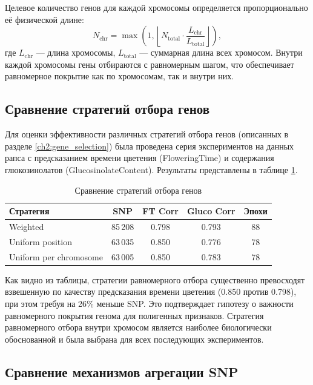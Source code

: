 Целевое количество генов для каждой хромосомы определяется 
пропорционально её физической длине:
\[
N_{\text{chr}} = \max\left(1, \left\lfloor N_{\text{total}} \cdot 
\frac{L_{\text{chr}}}{L_{\text{total}}} \right\rfloor\right),
\]
где $L_{\text{chr}}$ — длина хромосомы, $L_{\text{total}}$ — суммарная 
длина всех хромосом. Внутри каждой хромосомы гены отбираются с 
равномерным шагом, что обеспечивает равномерное покрытие как по 
хромосомам, так и внутри них.

\subsection{Сравнение стратегий отбора генов}

Для оценки эффективности различных стратегий отбора генов (описанных 
в разделе \ref{ch2:gene_selection}) была проведена серия экспериментов 
на данных рапса с предсказанием времени цветения (FloweringTime) и 
содержания глюкозинолатов (GlucosinolateContent). Результаты представлены 
в таблице \ref{tab:selection_comparison}.

\begin{table}
	\centering
	\caption{Сравнение стратегий отбора генов}
	\label{tab:selection_comparison}
	\begin{tabular}{|l|c|c|c|c|}
		\hline
		\textbf{Стратегия} & \textbf{SNP} & \textbf{FT Corr} & \textbf{Gluco Corr} & \textbf{Эпохи} \\ \hline
		Weighted & 85\,208 & 0.798 & 0.793 & 88 \\ \hline
		Uniform position & 63\,035 & 0.850 & 0.776 & 78 \\ \hline
		Uniform per chromosome & 63\,005 & 0.850 & 0.783 & 78 \\ \hline
	\end{tabular}
\end{table}

Как видно из таблицы, стратегии равномерного отбора существенно 
превосходят взвешенную по качеству предсказания времени цветения 
(0.850 против 0.798), при этом требуя на 26\% меньше SNP. Это 
подтверждает гипотезу о важности равномерного покрытия генома для 
полигенных признаков. Стратегия равномерного отбора внутри хромосом 
является наиболее биологически обоснованной и была выбрана для всех 
последующих экспериментов.

\subsection{Сравнение механизмов агрегации SNP}

